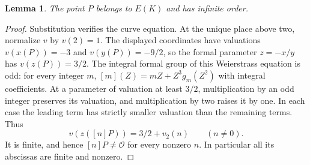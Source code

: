 \documentclass[11pt,a4paper]{article}
\newtheorem{lemma}[theorem]{Lemma}
\theoremstyle{definition}
\theoremstyle{remark}
\begin{document}
\begin{lemma}\label{lem:fixed-height-nontorsion}
The point $P$ belongs to $E(K)$ and has infinite order.
\end{lemma}
\begin{proof}
Substitution verifies the curve equation. At the unique place above two,
normalize $v$ by $v(2)=1$. The displayed coordinates have valuations
$v(x(P))=-3$ and $v(y(P))=-9/2$, so the formal parameter
$z=-x/y$ has $v(z(P))=3/2$. The integral formal group of this
Weierstrass equation is odd: for every integer $m$,
$[m](Z)=mZ+Z^3g_m(Z^2)$ with integral coefficients.
At a parameter of valuation at least $3/2$, multiplication by an odd
integer preserves its valuation, and multiplication by two raises it
by one. In each case the leading term has strictly smaller valuation
than the remaining terms. Thus
\[
                   v(z([n]P))=3/2+v_2(n)
                   \qquad(n\ne0).
\]
It is finite, and hence $[n]P\ne\mathcal O$ for every nonzero $n$.
In particular all its abscissas are finite and nonzero.
\end{proof}
\end{document}
